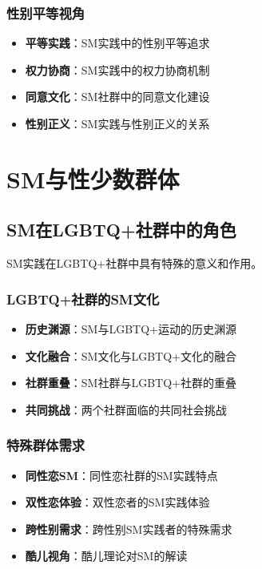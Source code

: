 \documentclass[12pt,UTF8]{ctexbook}
\begin{document}
\subsection{性别平等视角}
\begin{itemize}[leftmargin=2cm]
	\item \textbf{平等实践}：SM实践中的性别平等追求
	\item \textbf{权力协商}：SM实践中的权力协商机制
	\item \textbf{同意文化}：SM社群中的同意文化建设
	\item \textbf{性别正义}：SM实践与性别正义的关系
\end{itemize}

\chapter{SM与性少数群体}
\section{SM在LGBTQ+社群中的角色}
SM实践在LGBTQ+社群中具有特殊的意义和作用。

\subsection{LGBTQ+社群的SM文化}
\begin{itemize}[leftmargin=2cm]
	\item \textbf{历史渊源}：SM与LGBTQ+运动的历史渊源
	\item \textbf{文化融合}：SM文化与LGBTQ+文化的融合
	\item \textbf{社群重叠}：SM社群与LGBTQ+社群的重叠
	\item \textbf{共同挑战}：两个社群面临的共同社会挑战
\end{itemize}

\subsection{特殊群体需求}
\begin{itemize}[leftmargin=2cm]
	\item \textbf{同性恋SM}：同性恋社群的SM实践特点
	\item \textbf{双性恋体验}：双性恋者的SM实践体验
	\item \textbf{跨性别需求}：跨性别SM实践者的特殊需求
	\item \textbf{酷儿视角}：酷儿理论对SM的解读
\end{itemize}
\end{document}
